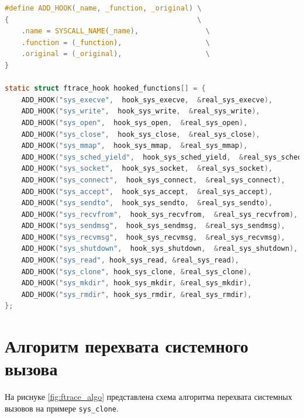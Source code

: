 \begin{lstlisting}[label=lst:ftrace-array, caption=Объявление массива перехватываемых функций и специальный макрос для его инициализации, language=c]
#define ADD_HOOK(_name, _function, _original) \
{                                             \
	.name = SYSCALL_NAME(_name),                \
	.function = (_function),                    \
	.original = (_original),                    \
}

static struct ftrace_hook hooked_functions[] = {
	ADD_HOOK("sys_execve",  hook_sys_execve,  &real_sys_execve),
	ADD_HOOK("sys_write",  hook_sys_write,  &real_sys_write),
	ADD_HOOK("sys_open",  hook_sys_open,  &real_sys_open),
	ADD_HOOK("sys_close",  hook_sys_close,  &real_sys_close),
	ADD_HOOK("sys_mmap",  hook_sys_mmap,  &real_sys_mmap),
	ADD_HOOK("sys_sched_yield",  hook_sys_sched_yield,  &real_sys_sched_yield),
	ADD_HOOK("sys_socket",  hook_sys_socket,  &real_sys_socket),
	ADD_HOOK("sys_connect",  hook_sys_connect,  &real_sys_connect),
	ADD_HOOK("sys_accept",  hook_sys_accept,  &real_sys_accept),
	ADD_HOOK("sys_sendto",  hook_sys_sendto,  &real_sys_sendto),
	ADD_HOOK("sys_recvfrom",  hook_sys_recvfrom,  &real_sys_recvfrom),
	ADD_HOOK("sys_sendmsg",  hook_sys_sendmsg,  &real_sys_sendmsg),
	ADD_HOOK("sys_recvmsg",  hook_sys_recvmsg,  &real_sys_recvmsg),
	ADD_HOOK("sys_shutdown",  hook_sys_shutdown,  &real_sys_shutdown),
	ADD_HOOK("sys_read", hook_sys_read, &real_sys_read),
	ADD_HOOK("sys_clone", hook_sys_clone, &real_sys_clone),
	ADD_HOOK("sys_mkdir", hook_sys_mkdir, &real_sys_mkdir),
	ADD_HOOK("sys_rmdir", hook_sys_rmdir, &real_sys_rmdir),
};
\end{lstlisting}

\section{Алгоритм перехвата системного вызова}

На риснуке \ref{fig:ftrace_algo} представлена схема алгоритма перехвата системных вызовов на примере \texttt{sys\_clone}.

